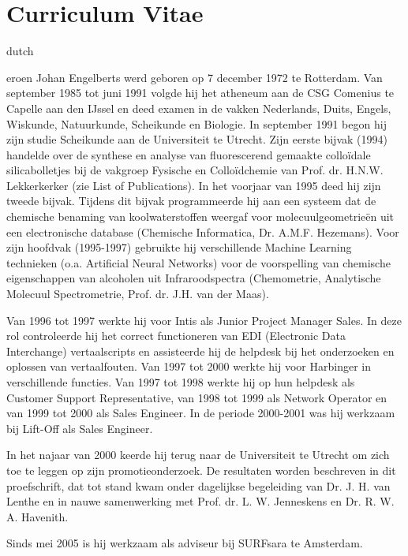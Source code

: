 \chapter*{Curriculum Vitae}
\fancyhead[RO]{\thepage}
\fancyhead[LE]{\thepage}
\begin{otherlanguage*}{dutch}
\label{cv}

\lettrine{}{}eroen Johan Engelberts werd geboren op 7 december 1972 te Rotterdam. Van september 1985 tot juni 1991 volgde hij het atheneum aan de CSG Comenius te Capelle aan den IJssel en deed examen in de vakken Nederlands, Duits, Engels, Wiskunde, Natuurkunde, Scheikunde en Biologie. In september 1991 begon hij zijn studie Scheikunde aan de Universiteit te Utrecht. Zijn eerste bijvak (1994) handelde over de synthese en analyse van fluorescerend gemaakte collo\"idale silicabolletjes bij de vakgroep Fysische en Collo\"idchemie van Prof. dr. H.N.W. Lekkerkerker (zie List of Publications). In het voorjaar van 1995 deed hij zijn tweede bijvak. Tijdens dit bijvak programmeerde hij aan een systeem dat de chemische benaming van koolwaterstoffen weergaf voor molecuulgeometrie\"en uit een electronische database (Chemische Informatica, Dr. A.M.F. Hezemans). Voor zijn hoofdvak (1995-1997) gebruikte hij verschillende Machine Learning technieken (o.a. Artificial Neural Networks) voor de voorspelling van chemische eigenschappen van alcoholen uit Infraroodspectra (Chemometrie, Analytische Molecuul Spectrometrie, Prof. dr. J.H. van der Maas).

Van 1996 tot 1997 werkte hij voor Intis als Junior Project Manager Sales. In deze rol controleerde hij het correct functioneren van EDI (Electronic Data Interchange) vertaalscripts en assisteerde hij de helpdesk bij het onderzoeken en oplossen van vertaalfouten.  Van 1997 tot 2000 werkte hij voor Harbinger in verschillende functies. Van 1997 tot 1998 werkte hij op hun helpdesk als Customer Support Representative, van 1998 tot 1999 als Network Operator en van 1999 tot 2000 als Sales Engineer. In de periode 2000-2001 was hij werkzaam bij Lift-Off als Sales Engineer.

In het najaar van 2000 keerde hij terug naar de Universiteit te Utrecht om zich toe te leggen op zijn promotieonderzoek. De resultaten worden beschreven in dit proefschrift, dat tot stand kwam onder dagelijkse begeleiding van Dr. J. H. van Lenthe en in nauwe samenwerking met Prof. dr. L. W. Jenneskens en Dr. R. W. A. Havenith.

Sinds mei 2005 is hij werkzaam als adviseur bij SURFsara te Amsterdam.
\end{otherlanguage*}

